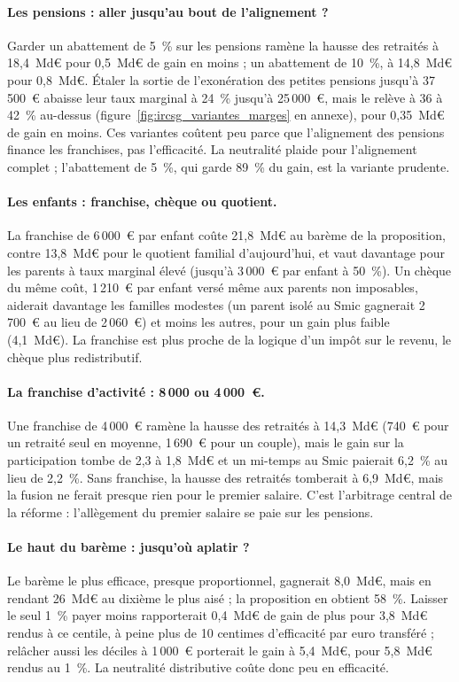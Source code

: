 \documentclass[11pt,a4paper]{article}
\begin{document}
\paragraph{Les pensions : aller jusqu'au bout de l'alignement ?} Garder un abattement de 5~\% sur les pensions ramène la
hausse des retraités à 18,4~Md€ pour 0,5~Md€ de gain en moins ; un abattement de 10~\%, à 14,8~Md€ pour 0,8~Md€. Étaler
la sortie de l'exonération des petites pensions jusqu'à 37\,500~€ abaisse leur taux marginal à 24~\% jusqu'à 25\,000~€,
mais le relève à 36 à 42~\% au-dessus (figure~\ref{fig:ircsg_variantes_marges} en annexe), pour 0,35~Md€ de gain en
moins. Ces variantes coûtent peu parce que l'alignement des pensions finance les franchises, pas l'efficacité. La
neutralité plaide pour l'alignement complet ; l'abattement de 5~\%, qui garde 89~\% du gain, est la variante prudente.

\paragraph{Les enfants : franchise, chèque ou quotient.} La franchise de 6\,000~€ par enfant coûte 21,8~Md€ au barème de
la proposition, contre 13,8~Md€ pour le quotient familial d'aujourd'hui, et vaut davantage pour les parents à taux
marginal élevé (jusqu'à 3\,000~€ par enfant à 50~\%). Un chèque du même coût, 1\,210~€ par enfant versé même aux parents
non imposables, aiderait davantage les familles modestes (un parent isolé au Smic gagnerait 2\,700~€ au lieu de
2\,060~€) et moins les autres, pour un gain plus faible (4,1~Md€). La franchise est plus proche de la logique d'un impôt
sur le revenu, le chèque plus redistributif.

\paragraph{La franchise d'activité : 8\,000 ou 4\,000~€.} Une franchise de 4\,000~€ ramène la hausse des retraités à
14,3~Md€ (740~€ pour un retraité seul en moyenne, 1\,690~€ pour un couple), mais le gain sur la participation tombe de
2,3 à 1,8~Md€ et un mi-temps au Smic paierait 6,2~\% au lieu de 2,2~\%. Sans franchise, la hausse des retraités
tomberait à 6,9~Md€, mais la fusion ne ferait presque rien pour le premier salaire. C'est l'arbitrage central de la
réforme : l'allègement du premier salaire se paie sur les pensions.

\paragraph{Le haut du barème : jusqu'où aplatir ?} Le barème le plus efficace, presque proportionnel, gagnerait 8,0~Md€,
mais en rendant 26~Md€ au dixième le plus aisé ; la proposition en obtient 58~\%. Laisser le seul 1~\% payer moins
rapporterait 0,4~Md€ de gain de plus pour 3,8~Md€ rendus à ce centile, à peine plus de 10 centimes d'efficacité par euro
transféré ; relâcher aussi les déciles à 1\,000~€ porterait le gain à 5,4~Md€, pour 5,8~Md€ rendus au 1~\%. La
neutralité distributive coûte donc peu en efficacité.
\end{document}
